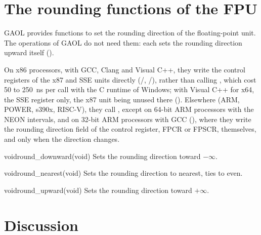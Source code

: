 \section{The rounding functions of the FPU}\label{chap:fpu}
%

GAOL provides functions to set the rounding direction of the floating-point
unit. The operations of GAOL do not need them: each sets the rounding
direction upward itself ().

\medskip
On x86 processors, with GCC, Clang and Visual C++, they write the control
registers of the x87 and SSE units directly (/,
/), rather than calling ,
which cost 50 to 250~ns per call with the C runtime of Windows; with Visual
C++ for x64, the SSE register only, the x87 unit being unused there
().\newinvfive{} Elsewhere (ARM, POWER,
s390x, RISC-V), they call , except on 64-bit ARM
processors with the NEON intervals, and on 32-bit ARM processors with GCC
(), where they write the rounding direction field of the
control register, FPCR or FPSCR, themselves, and only when the direction
changes.\newinvfive

\begin{deffun}{void}{round\_downward}{(void)}
Sets the rounding direction toward $-\infty$.
\end{deffun}

\begin{deffun}{void}{round\_nearest}{(void)}
  Sets the rounding direction to nearest, ties to even.
\end{deffun}

\begin{deffun}{void}{round\_upward}{(void)}
  Sets the rounding direction toward $+\infty$.
\end{deffun}

\section{Discussion}

